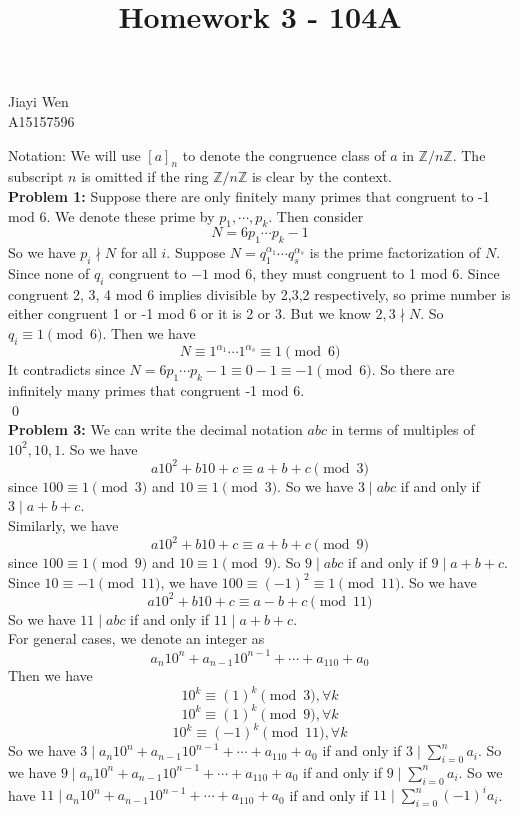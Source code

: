 \documentclass[12pt]{amsart}
\newcommand{\Z}{\mathbb{Z}}
\begin{document}
\title{Homework 3 - 104A}
\maketitle
\begin{center}
    Jiayi Wen\\
    A15157596
\end{center}
Notation: We will use $[a]_n$ to denote the congruence class of $a$ in $\Z/n\Z$. The subscript $n$ is omitted if the ring $\Z/n\Z$ is clear by the context.\\
\textbf{Problem 1:} Suppose there are only finitely many primes that congruent to -1 mod 6. We denote these prime by $p_1,\cdots, p_k$. Then consider 
\[N=6p_1\cdots p_k-1\]
So we have $p_i\nmid N$ for all $i$. Suppose $N=q_1^{\alpha_1}\cdots q_s^{\alpha_s}$ is the prime factorization of $N$. Since none of $q_i$ congruent to $-1$ mod 6, they must congruent to 1 mod 6. Since congruent 2, 3, 4 mod 6 implies divisible by 2,3,2 respectively, so prime number is either congruent 1 or -1 mod 6 or it is 2 or 3. But we know $2,3\nmid N$. So $q_i\equiv 1\pmod{ 6}$. Then we have 
\[N\equiv 1^{\alpha_1}\cdots 1^{\alpha_s}\equiv 1\pmod{6}\]
It contradicts since $N=6p_1\cdots p_k-1\equiv 0-1\equiv -1\pmod{6}$. So there are infinitely many primes that congruent -1 mod 6.
\\\qed\\
\textbf{Problem 3:} We can write the decimal notation $abc$ in terms of multiples of $10^2,10,1$. So we have 
\[a10^2+b10+c\equiv a+b+c \pmod 3\]
since $100\equiv 1\pmod 3$ and $10\equiv 1\pmod 3$. So we have $3\mid abc $ if and only if $3\mid a+b+c$.\\
Similarly, we have 
\[a10^2+b10+c\equiv a+b+c\pmod{9}\]
since $100\equiv 1\pmod 9$ and $10\equiv 1\pmod 9$. So $9\mid abc$ if and only if $9\mid a+b+c$.\\
Since $10\equiv -1\pmod {11}$, we have $100\equiv (-1)^2\equiv 1\pmod {11}$.
So we have 
\[a10^2+b10+c\equiv a-b+c\pmod{11}\]
So we have $11\mid abc$ if and only if $11\mid a+b+c$.\\
For general cases, we denote an integer as 
\[a_n10^n+a_{n-1}10^{n-1}+\cdots+ a_110+a_0\]
Then we have 
\[10^k\equiv (1)^k\pmod 3,\forall k\]
\[10^k\equiv (1)^k\pmod 9, \forall k\]
\[10^k\equiv (-1)^k\pmod {11}, \forall k\]
So we have $3\mid a_n10^n+a_{n-1}10^{n-1}+\cdots+ a_110+a_0$ if and only if $3\mid \sum_{i=0}^n a_i$.
So we have $9\mid a_n10^n+a_{n-1}10^{n-1}+\cdots+ a_110+a_0$ if and only if $9\mid \sum_{i=0}^n a_i$.
So we have $11\mid a_n10^n+a_{n-1}10^{n-1}+\cdots+ a_110+a_0$ if and only if $11\mid \sum_{i=0}^n (-1)^ia_i$.
\end{document}
